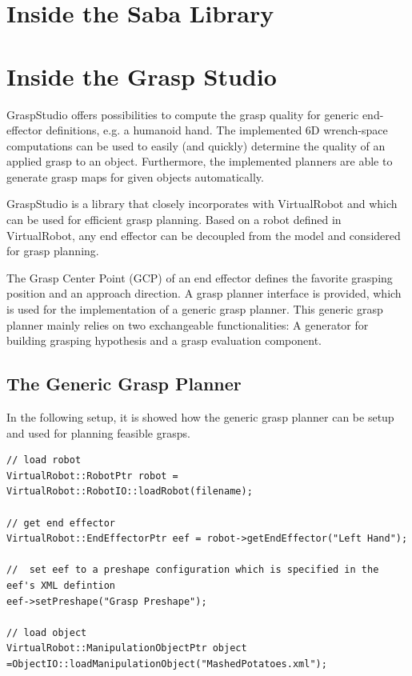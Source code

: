\section{Inside the Saba Library}
\section{Inside the Grasp Studio}
GraspStudio offers possibilities to compute the grasp quality for generic end-effector definitions, e.g. a humanoid hand. The implemented 6D wrench-space computations can be used to easily (and quickly) determine the quality of an applied grasp to an object. Furthermore, the implemented planners are able to generate grasp maps for given objects automatically. \par GraspStudio is a library that closely incorporates with VirtualRobot and which can be used for efficient grasp planning. Based on a robot defined in VirtualRobot, any end effector can be decoupled from the model and considered for grasp planning. \par The Grasp Center Point (GCP) of an end effector defines the favorite grasping position and an approach direction. A grasp planner interface is provided, which is used for the implementation of a generic grasp planner. This generic grasp planner mainly relies on two exchangeable functionalities: A generator for building grasping hypothesis and a grasp evaluation component.

\subsection{The Generic Grasp Planner}
In the following setup, it is showed how the generic grasp planner can be setup and used for planning feasible grasps. 
\begin{lstlisting}
// load robot
VirtualRobot::RobotPtr robot = VirtualRobot::RobotIO::loadRobot(filename);

// get end effector
VirtualRobot::EndEffectorPtr eef = robot->getEndEffector("Left Hand");

//  set eef to a preshape configuration which is specified in the eef's XML defintion 
eef->setPreshape("Grasp Preshape");

// load object
VirtualRobot::ManipulationObjectPtr object =ObjectIO::loadManipulationObject("MashedPotatoes.xml");
\end{lstlisting}
